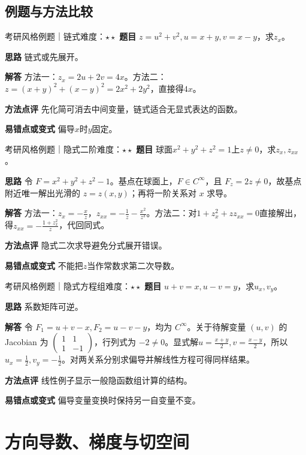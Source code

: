 \subsection{例题与方法比较}
\begin{example}{考研风格例题｜链式}{难度：$\star\star$}
\label{ex:6:4}\textbf{题目} $z=u^2+v^2,u=x+y,v=x-y$，求$z_x$。\par
\textbf{思路} 链式或先展开。\par
\textbf{解答} 方法一：$z_x=2u+2v=4x$。方法二：$z=(x+y)^2+(x-y)^2=2x^2+2y^2$，直接得$4x$。\par
\textbf{方法点评} 先化简可消去中间变量，链式适合无显式表达的函数。\par
\textbf{易错点或变式} 偏导$x$时$y$固定。
\end{example}
\begin{example}{考研风格例题｜隐式二阶}{难度：$\star\star$}
\label{ex:6:5}\textbf{题目} 球面$x^2+y^2+z^2=1$上$z\ne0$，求$z_x,z_{xx}$。\par
\textbf{思路} 令 $F=x^2+y^2+z^2-1$。基点在球面上，$F\in C^\infty$，且 $F_z=2z\ne0$，故基点附近唯一解出光滑的 $z=z(x,y)$；再将一阶关系对 $x$ 求导。\par
\textbf{解答} 方法一：$z_x=-\frac{x}{z}$，$z_{xx}=-\frac{1}{z}-\frac{x^2}{z^3}$。方法二：对$1+z_x^2+zz_{xx}=0$直接解出，得$z_{xx}=-\frac{1+z_x^2}{z}$，代回同式。\par
\textbf{方法点评} 隐式二次求导避免分式展开错误。\par
\textbf{易错点或变式} 不能把$z$当作常数求第二次导数。
\end{example}
\begin{example}{考研风格例题｜隐式方程组}{难度：$\star\star$}
\label{ex:6:6}\textbf{题目} $u+v=x,u-v=y$，求$u_x,v_y$。\par
\textbf{思路} 系数矩阵可逆。\par
\textbf{解答} 令 $F_1=u+v-x,F_2=u-v-y$，均为 $C^\infty$。关于待解变量 $(u,v)$ 的 Jacobian 为 $\begin{pmatrix}1&1\\1&-1\end{pmatrix}$，行列式为 $-2\ne0$。显式解$u=\frac{x+y}{2},v=\frac{x-y}{2}$，所以$u_x=\frac{1}{2},v_y=-\frac{1}{2}$。对两关系分别求偏导并解线性方程可得同样结果。\par
\textbf{方法点评} 线性例子显示一般隐函数组计算的结构。\par
\textbf{易错点或变式} 偏导变量变换时保持另一自变量不变。
\end{example}
\section{方向导数、梯度与切空间}\label{sec:6:3}

